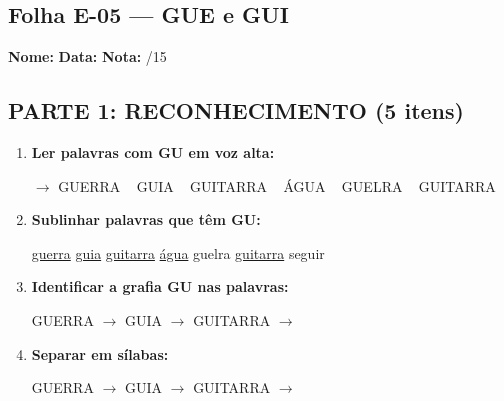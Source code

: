 \subsection{Folha E-05 --- GUE e GUI}
\begin{exercicio}



\noindent\textbf{Nome:} \underline{\hspace{3.2cm}} \quad \textbf{Data:} \underline{\hspace{1.6cm}} \quad \textbf{Nota:} \underline{\hspace{0.9cm}}/15


\subsection*{PARTE 1: RECONHECIMENTO (5 itens)}

\begin{enumerate}

  \item \textbf{Ler palavras com GU em voz alta:}
  \begin{center}
  $\rightarrow$ GUERRA ~ GUIA ~ GUITARRA ~ ÁGUA ~ GUELRA ~ GUITARRA
  \end{center}

  \item \textbf{Sublinhar palavras que têm GU:}

\begin{center}
  \uline{guerra} \quad \uline{guia} \quad \uline{guitarra} \quad \uline{água} \quad guelra \quad \uline{guitarra} \quad seguir
\end{center}

  \item \textbf{Identificar a grafia GU nas palavras:}
  \begin{center}
  GUERRA $\rightarrow$ \underline{\hspace{1cm}} \quad GUIA $\rightarrow$ \underline{\hspace{1cm}} \quad GUITARRA $\rightarrow$ \underline{\hspace{1cm}}
  \end{center}

  \item \textbf{Separar em sílabas:}
  \begin{center}
  GUERRA $\rightarrow$ \underline{\hspace{1.2cm}} \quad GUIA $\rightarrow$ \underline{\hspace{1.2cm}} \quad GUITARRA $\rightarrow$ \underline{\hspace{1.2cm}}
  \end{center}


\end{enumerate}
\end{exercicio}
